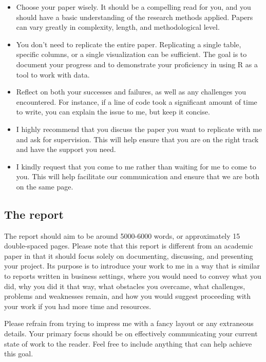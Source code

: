 \documentclass[
  12pt,
]{article}
\providecommand{\tightlist}{%
  \setlength{\itemsep}{0pt}\setlength{\parskip}{0pt}}
\begin{document}
\begin{itemize}
\tightlist
\item
  Choose your paper wisely. It should be a compelling read for you, and you should have a basic understanding of the research methods applied. Papers can vary greatly in complexity, length, and methodological level.
\item
  You don't need to replicate the entire paper. Replicating a single table, specific columns, or a single visualization can be sufficient. The goal is to document your progress and to demonstrate your proficiency in using R as a tool to work with data.
\item
  Reflect on both your successes and failures, as well as any challenges you encountered. For instance, if a line of code took a significant amount of time to write, you can explain the issue to me, but keep it concise.
\item
  I highly recommend that you discuss the paper you want to replicate with me and ask for supervision. This will help ensure that you are on the right track and have the support you need.
\item
  I kindly request that you come to me rather than waiting for me to come to you. This will help facilitate our communication and ensure that we are both on the same page.
\end{itemize}

\hypertarget{the-report}{%
\subsection{The report}\label{the-report}}

The report should aim to be around 5000-6000 words, or approximately 15 double-spaced pages. Please note that this report is different from an academic paper in that it should focus solely on documenting, discussing, and presenting your project. Its purpose is to introduce your work to me in a way that is similar to reports written in business settings, where you would need to convey what you did, why you did it that way, what obstacles you overcame, what challenges, problems and weaknesses remain, and how you would suggest proceeding with your work if you had more time and resources.

Please refrain from trying to impress me with a fancy layout or any extraneous details. Your primary focus should be on effectively communicating your current state of work to the reader. Feel free to include anything that can help achieve this goal.
\end{document}
